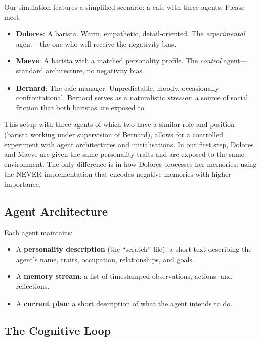 Our simulation features a simplified scenario: a cafe with three agents. Please meet:
\begin{itemize}
    \item \textbf{Dolores}: A barista. Warm, empathetic, detail-oriented. The \emph{experimental} agent---the one who will receive the negativity bias.
    \item \textbf{Maeve}: A barista with a matched personality profile. The \emph{control} agent---standard architecture, no negativity bias.
    \item \textbf{Bernard}: The cafe manager. Unpredictable, moody, occasionally confrontational. Bernard serves as a naturalistic \emph{stressor}: a source of social friction that both baristas are exposed to.
\end{itemize}

This setup with three agents of which two have a similar role and position (barista working under supervision of Bernard), allows for a controlled experiment with agent architectures and initialisations. In our first step, Dolores and Maeve are given the same personality traits and are exposed to the same environment. The only difference is in how Dolores processes her memories: using the NEVER implementation that encodes negative memories with higher importance.

\subsection{Agent Architecture}

Each agent maintains:
\begin{itemize}
    \item A \textbf{personality description} (the ``scratch'' file): a short text describing the agent's name, traits, occupation, relationships, and goals.
    \item A \textbf{memory stream}: a list of timestamped observations, actions, and reflections.
    \item A \textbf{current plan}: a short description of what the agent intends to do.
\end{itemize}

\subsection{The Cognitive Loop}

